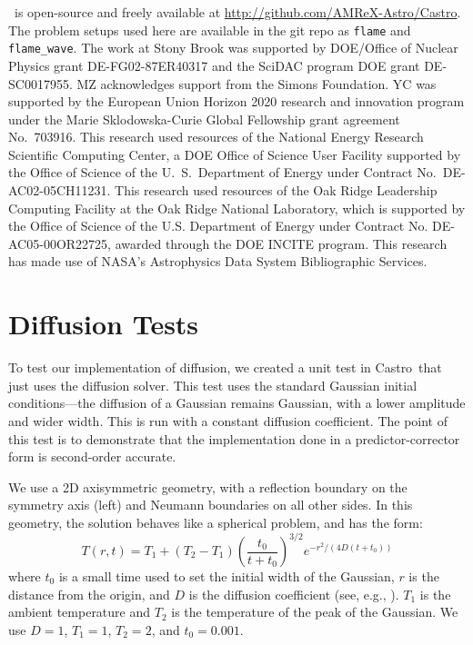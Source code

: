 \documentclass[preprint,times,tighten]{aastex63}
\newcommand{\castro}{{\sf Castro}}
\begin{document}
\acknowledgements \castro\ is open-source and freely available at
\url{http://github.com/AMReX-Astro/Castro}.  The problem setups used
here are available in the git repo as {\tt flame} and {\tt
  flame\_wave}.  The work at Stony Brook was supported by DOE/Office
of Nuclear Physics grant DE-FG02-87ER40317 and the SciDAC program DOE grant DE-SC0017955.  MZ acknowledges support
from the Simons Foundation.  YC was supported by the
European Union Horizon 2020 research and innovation program under
the Marie Sklodowska-Curie Global Fellowship grant agreement No.\
703916.  This research used resources of the National Energy Research
Scientific Computing Center, a DOE Office of Science User Facility
supported by the Office of Science of the U.~S.\ Department of Energy
under Contract No.\ DE-AC02-05CH11231.  This research used resources
of the Oak Ridge Leadership Computing Facility at the Oak Ridge
National Laboratory, which is supported by the Office of Science of
the U.S. Department of Energy under Contract No. DE-AC05-00OR22725,
awarded through the DOE INCITE program.  This research has made use of
NASA's Astrophysics Data System Bibliographic Services.






\appendix

\section{Diffusion Tests}
\label{app:diffusion}

To test our implementation of diffusion, we created a unit test in
\castro\ that just uses the diffusion solver.  This test uses the
standard Gaussian initial conditions---the diffusion of a Gaussian
remains Gaussian, with a lower amplitude and wider width.  This is run
with a constant diffusion coefficient. The point of this test is to
demonstrate that the implementation done in a predictor-corrector
form is second-order accurate.

We use a 2D axisymmetric geometry, with a reflection boundary on the symmetry axis (left)
and Neumann boundaries on all other sides.  In this geometry, the solution behaves like
a spherical problem, and has the form:
\begin{equation}
  T(r,t) = T_1 + (T_2 - T_1) \left (\frac{t_0}{t + t_0} \right )^{3/2} e^{-r^2/(4 D (t + t_0))}
\end{equation}
where $t_0$ is a small time used to set the initial width of the
Gaussian, $r$ is the distance from the origin, and $D$ is the
diffusion coefficient (see, e.g., \citet{SWE_MYRA09}).  $T_1$ is the ambient temperature and $T_2$ is
the temperature of the peak of the Gaussian.  We use $D = 1$, $T_1 = 1$, $T_2 = 2$,
and $t_0 = 0.001$.
\end{document}
